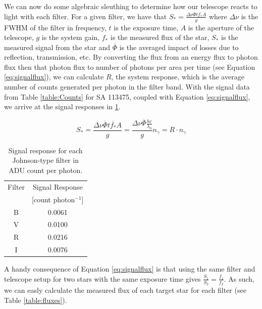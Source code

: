 \documentclass{article}
\newcommand{\obar}[1]{\ensuremath{\overline{ #1 }}}
\begin{document}
We can now do some algebraic sleuthing to determine how our telescope reacts to light with each filter. For a given filter,
we have that $S_*=\frac{\Delta\nu{\obar{\Phi}}t{\obar{f_*}}A}{g}$ where $\Delta\nu$ is the FWHM of the filter in frequency,
$t$ is the exposure time, $A$ is the aperture of the telescope, $g$ is the system gain, $f_*$ is the measured flux
of the star, $S_*$ is the measured signal from the star and $\obar\Phi$ is the averaged impact of losses due to reflection, transmission, etc.
By converting the flux from an energy flux to photon flux then that photon flux to number of photons per area per time (see Equation
\ref{eq:signalflux}), we can calculate $R$, the system response, which is the average number of counts generated per photon in the filter band. 
With the signal data from Table \ref{table:Counts} for SA 113475, 
coupled with Equation \ref{eq:signalflux}, we arrive at the signal responses in \ref{table:response}.

\begin{equation}
\label{eq:signalflux}
S_*=\frac{\Delta\nu{\obar{\Phi}}t{\obar{f_*}}A}{g}=\frac{\Delta\nu{\obar{\Phi}}\frac{hc}{\lambda_0}}{g}n_\gamma=R\cdot n_\gamma
\end{equation}

\begin{table}
\begin{center}
\begin{tabular}{c | c}
Filter & Signal Response \\
& [count photon$^{-1}$]\\
\hline
B & 0.0061\\
V & 0.0100\\
R & 0.0216\\
I & 0.0076
\end{tabular}
\caption{Signal response for each Johnson-type filter in ADU count per photon.}
\label{table:response}
\end{center}
\end{table}

A handy consequence of Equation \ref{eq:signalflux} is that using the same filter and telescope setup for two
stars with the same exposure time gives $\frac{S_1}{S_2}=\frac{f_1}{f_2}$. As such, we can easly calculate the measured flux
of each target star for each filter (see Table \ref{table:fluxes}).
\end{document}
